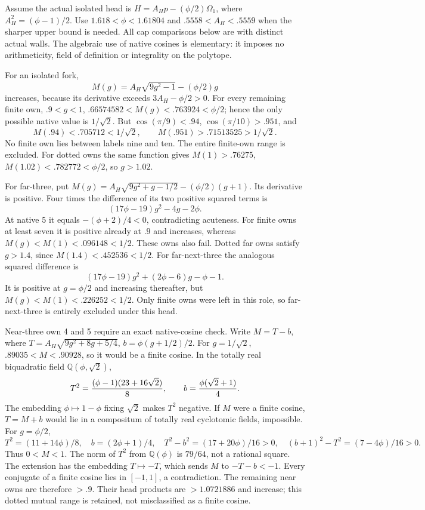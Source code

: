 \documentclass[11pt]{article}
\theoremstyle{definition}
\theoremstyle{remark}
\begin{document}
Assume the actual isolated head is
\(H=A_Hp-(\phi/2)\Omega_1\), where
\(A_H^2=(\phi-1)/2\).
Use \(1.618<\phi<1.61804\) and
\(.5558<A_H<.5559\) when the sharper upper bound is needed.
All cap comparisons below are with distinct actual walls.
The algebraic use of native cosines is elementary: it imposes
no arithmeticity, field of definition or integrality on the polytope.

For an isolated fork,
\[
 M(g)=A_H\sqrt{9g^2-1}-(\phi/2)g
\]
increases, because its derivative exceeds \(3A_H-\phi/2>0\).
For every remaining finite own, \(.9<g<1\),
\(.66574582<M(g)<.763924<\phi/2\); hence the only possible
native value is \(1/\sqrt2\).
But \(\cos(\pi/9)<.94\), \(\cos(\pi/10)>.951\), and
\[
 M(.94)<.705712<1/\sqrt2,\qquad
 M(.951)>.71513525>1/\sqrt2 .
\]
No finite own lies between labels nine and ten.
The entire finite-own range is excluded.
For dotted owns the same function gives
\(M(1)>.76275\), \(M(1.02)<.782772<\phi/2\),
so \(g>1.02\).

For far-three, put
\(M(g)=A_H\sqrt{9g^2+g-1/2}-(\phi/2)(g+1)\).
Its derivative is positive.
Four times the difference of its two positive squared terms is
\[
                  (17\phi-19)g^2-4g-2\phi .
\]
At native 5 it equals \(-(\phi+2)/4<0\), contradicting acuteness.
For finite owns at least seven it is positive already at \(.9\)
and increases, whereas \(M(g)<M(1)<.096148<1/2\).
These owns also fail.
Dotted far owns satisfy \(g>1.4\), since
\(M(1.4)<.452536<1/2\).
For far-next-three the analogous squared difference is
\[
             (17\phi-19)g^2+(2\phi-6)g-\phi-1.
\]
It is positive at \(g=\phi/2\) and increasing thereafter,
but \(M(g)<M(1)<.226252<1/2\).
Only finite owns were left in this role, so far-next-three is
entirely excluded under this head.

Near-three own 4 and 5 require an exact native-cosine check.
Write \(M=T-b\), where
\(T=A_H\sqrt{9g^2+8g+5/4}\),
\(b=\phi(g+1/2)/2\).
For \(g=1/\sqrt2\), \(.89035<M<.90928\), so it would be
a finite cosine.  In the totally real biquadratic field
\(\mathbb Q(\phi,\sqrt2)\),
\[
 T^2={(\phi-1)(23+16\sqrt2)\over8},\qquad
 b={\phi(\sqrt2+1)\over4}.
\]
The embedding \(\phi\mapsto1-\phi\) fixing \(\sqrt2\)
makes \(T^2\) negative.
If \(M\) were a finite cosine, \(T=M+b\) would lie in a
compositum of totally real cyclotomic fields, impossible.
For \(g=\phi/2\),
\[
 T^2=(11+14\phi)/8,\quad b=(2\phi+1)/4,\quad
 T^2-b^2=(17+20\phi)/16>0,\quad
 (b+1)^2-T^2=(7-4\phi)/16>0 .
\]
Thus \(0<M<1\).
The norm of \(T^2\) from \(\mathbb Q(\phi)\) is \(79/64\),
not a rational square.  The extension has the embedding
\(T\mapsto-T\), which sends \(M\) to \(-T-b<-1\).
Every conjugate of a finite cosine lies in \([-1,1]\), a
contradiction.
The remaining near owns are therefore \(>.9\).
Their head products are \(>1.0721886\) and increase; this dotted
mutual range is retained, not misclassified as a finite cosine.
\end{document}
